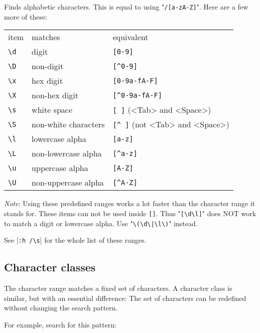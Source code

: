 Finds alphabetic characters.
This is equal to using "\texttt{/[a-zA-Z]}".
Here are a few more of these:

\begin{center} \begin{tabular}{l l l}
				item & matches & equivalent \\
				\texttt{\textbackslash{}d} & digit & \texttt{[0-9]}\\
				\texttt{\textbackslash{}D} & non-digit & \texttt{[\^{}0-9]}\\
				\texttt{\textbackslash{}x} & hex digit & \texttt{[0-9a-fA-F]}\\
				\texttt{\textbackslash{}X} & non-hex digit & \texttt{[\^{}0-9a-fA-F]}\\
				\texttt{\textbackslash{}s} & white space & \texttt{[   ]} (<Tab> and <Space>)\\
				\texttt{\textbackslash{}S} & non-white characters & \texttt{[\^{}  ]} (not <Tab> and <Space>)\\
				\texttt{\textbackslash{}l} & lowercase alpha & \texttt{[a-z]}\\
				\texttt{\textbackslash{}L} & non-lowercase alpha & \texttt{[\^{}a-z]}\\
				\texttt{\textbackslash{}u} & uppercase alpha & \texttt{[A-Z]}\\
				\texttt{\textbackslash{}U} & non-uppercase alpha & \texttt{[\^{}A-Z]}\\
\end{tabular} \end{center}

\emph{Note}:
Using these predefined ranges works a lot faster than the character range it stands for.
These items can not be used inside \texttt{[]}.
Thus "\texttt{[\textbackslash{}d\textbackslash{}l]}" does NOT work to match a digit or lowercase alpha.
Use "\texttt{\textbackslash{}(\textbackslash{}d\textbackslash{}|\textbackslash{}l\textbackslash{})}" instead.

See |\texttt{:h /\textbackslash{}s}| for the whole list of these ranges.
\subsection{Character classes}
The character range matches a fixed set of characters.
A character class is similar, but with an essential difference: The set of characters can be redefined without changing the search pattern.

For example, search for this pattern:

